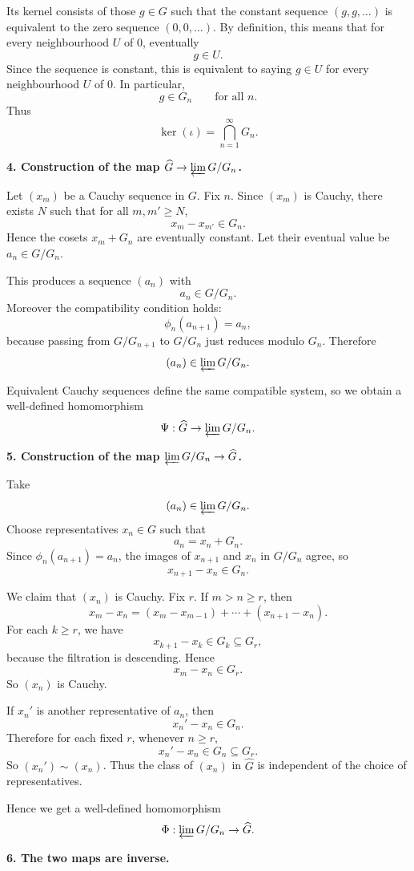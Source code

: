 \documentclass[12pt,a4paper]{article}
\theoremstyle{plain}
\theoremstyle{definition}      %
\begin{document}
Its kernel consists of those \(g\in G\) such that the constant sequence \((g,g,\dots)\) is equivalent to the zero sequence \((0,0,\dots)\). By definition, this means that for every neighbourhood \(U\) of \(0\), eventually
\[
g\in U.
\]
Since the sequence is constant, this is equivalent to saying \(g\in U\) for every neighbourhood \(U\) of \(0\). In particular,
\[
g\in G_n
\qquad\text{for all }n.
\]
Thus
\[
\ker(\iota)=\bigcap_{n=1}^{\infty}G_n.
\]

\medskip
\textbf{4. Construction of the map \(\widehat G\to \varprojlim G/G_n\).}

Let \((x_m)\) be a Cauchy sequence in \(G\). Fix \(n\). Since \((x_m)\) is Cauchy, there exists \(N\) such that for all \(m,m'\ge N\),
\[
x_m-x_{m'}\in G_n.
\]
Hence the cosets \(x_m+G_n\) are eventually constant. Let their eventual value be \(a_n\in G/G_n\).

This produces a sequence \((a_n)\) with
\[
a_n\in G/G_n.
\]
Moreover the compatibility condition holds:
\[
\phi_n(a_{n+1})=a_n,
\]
because passing from \(G/G_{n+1}\) to \(G/G_n\) just reduces modulo \(G_n\). Therefore
\[
(a_n)\in \varprojlim G/G_n.
\]

Equivalent Cauchy sequences define the same compatible system, so we obtain a well-defined homomorphism
\[
\Psi:\widehat G\to \varprojlim G/G_n.
\]

\medskip
\textbf{5. Construction of the map \(\varprojlim G/G_n\to \widehat G\).}

Take
\[
(a_n)\in \varprojlim G/G_n.
\]
Choose representatives \(x_n\in G\) such that
\[
a_n=x_n+G_n.
\]
Since \(\phi_n(a_{n+1})=a_n\), the images of \(x_{n+1}\) and \(x_n\) in \(G/G_n\) agree, so
\[
x_{n+1}-x_n\in G_n.
\]

We claim that \((x_n)\) is Cauchy. Fix \(r\). If \(m>n\ge r\), then
\[
x_m-x_n=(x_m-x_{m-1})+\cdots+(x_{n+1}-x_n).
\]
For each \(k\ge r\), we have
\[
x_{k+1}-x_k\in G_k\subseteq G_r,
\]
because the filtration is descending. Hence
\[
x_m-x_n\in G_r.
\]
So \((x_n)\) is Cauchy.

If \(x_n'\) is another representative of \(a_n\), then
\[
x_n'-x_n\in G_n.
\]
Therefore for each fixed \(r\), whenever \(n\ge r\),
\[
x_n'-x_n\in G_n\subseteq G_r.
\]
So \((x_n')\sim (x_n)\). Thus the class of \((x_n)\) in \(\widehat G\) is independent of the choice of representatives.

Hence we get a well-defined homomorphism
\[
\Phi:\varprojlim G/G_n\to \widehat G.
\]

\medskip
\textbf{6. The two maps are inverse.}
\end{document}
